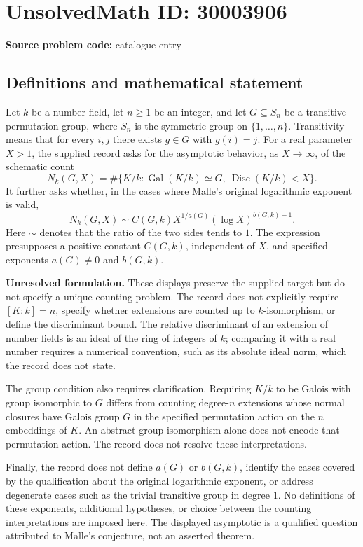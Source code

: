 \documentclass[11pt]{article}
\begin{document}
\section*{UnsolvedMath ID: 30003906}
\textbf{Source problem code:} catalogue entry
\subsection{Definitions and mathematical statement}
Let \(k\) be a number field, let \(n\geq 1\) be an integer, and let \(G\subseteq S_n\) be a transitive permutation group, where \(S_n\) is the symmetric group on \(\{1,\ldots,n\}\). Transitivity means that for every \(i,j\) there exists \(g\in G\) with \(g(i)=j\). For a real parameter \(X>1\), the supplied record asks for the asymptotic behavior, as \(X\to\infty\), of the schematic count
\[
N_k(G,X)=\#\bigl\{K/k:\operatorname{Gal}(K/k)\simeq G,\ \operatorname{Disc}(K/k)<X\bigr\}.
\]
It further asks whether, in the cases where Malle's original logarithmic exponent is valid,
\[
N_k(G,X)\sim C(G,k)X^{1/a(G)}(\log X)^{b(G,k)-1}.
\]
Here \(\sim\) denotes that the ratio of the two sides tends to \(1\). The expression presupposes a positive constant \(C(G,k)\), independent of \(X\), and specified exponents \(a(G)\neq 0\) and \(b(G,k)\).

\textbf{Unresolved formulation.} These displays preserve the supplied target but do not specify a unique counting problem. The record does not explicitly require \([K:k]=n\), specify whether extensions are counted up to \(k\)-isomorphism, or define the discriminant bound. The relative discriminant of an extension of number fields is an ideal of the ring of integers of \(k\); comparing it with a real number requires a numerical convention, such as its absolute ideal norm, which the record does not state.

The group condition also requires clarification. Requiring \(K/k\) to be Galois with group isomorphic to \(G\) differs from counting degree-\(n\) extensions whose normal closures have Galois group \(G\) in the specified permutation action on the \(n\) embeddings of \(K\). An abstract group isomorphism alone does not encode that permutation action. The record does not resolve these interpretations.

Finally, the record does not define \(a(G)\) or \(b(G,k)\), identify the cases covered by the qualification about the original logarithmic exponent, or address degenerate cases such as the trivial transitive group in degree \(1\). No definitions of these exponents, additional hypotheses, or choice between the counting interpretations are imposed here. The displayed asymptotic is a qualified question attributed to Malle's conjecture, not an asserted theorem.
\end{document}
